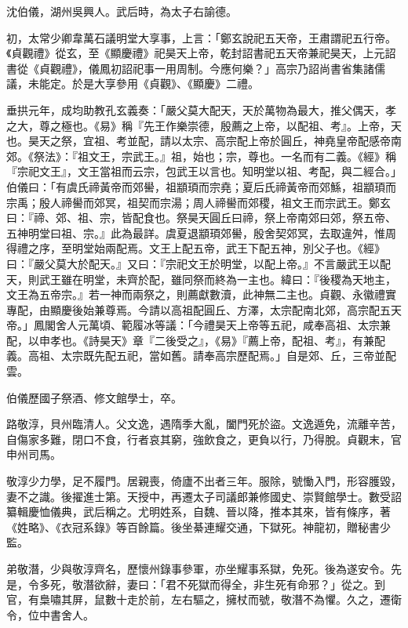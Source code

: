 \begin{pinyinscope}
 沈伯儀，湖州吳興人。武后時，為太子右諭德。



 初，太常少卿韋萬石議明堂大享事，上言：「鄭玄說祀五天帝，王肅謂祀五行帝。《貞觀禮》從玄，至《顯慶禮》祀昊天上帝，乾封詔書祀五天帝兼祀昊天，上元詔書從《貞觀禮》，儀鳳初詔祀事一用周制。今應何樂？」高宗乃詔尚書省集諸儒議，未能定。於是大享參用《貞觀》、《顯慶》二禮。



 垂拱元年，成均助教孔玄義奏：「嚴父莫大配天，天於萬物為最大，推父偶天，孝之大，尊之極也。《易》稱『先王作樂崇德，殷薦之上帝，以配祖、考』。上帝，天也。昊天之祭，宜祖、考並配，請以太宗、高宗配上帝於圓丘，神堯皇帝配感帝南郊。《祭法》：『祖文王，宗武王。』祖，始也；宗，尊也。一名而有二義。《經》稱『宗祀文王』，文王當祖而云宗，包武王以言也。知明堂以祖、考配，與二經合。」伯儀曰：「有虞氏禘黃帝而郊嚳，祖顓頊而宗堯；夏后氏禘黃帝而郊鯀，祖顓頊而宗禹；殷人禘嚳而郊冥，祖契而宗湯；周人禘嚳而郊稷，祖文王而宗武王。鄭玄曰：『禘、郊、祖、宗，皆配食也。祭昊天圓丘曰禘，祭上帝南郊曰郊，祭五帝、五神明堂曰祖、宗。』此為最詳。虞夏退顓頊郊嚳，殷舍契郊冥，去取違舛，惟周得禮之序，至明堂始兩配焉。文王上配五帝，武王下配五神，別父子也。《經》曰：『嚴父莫大於配天。』又曰：『宗祀文王於明堂，以配上帝。』不言嚴武王以配天，則武王雖在明堂，未齊於配，雖同祭而終為一主也。緯曰：『後稷為天地主，文王為五帝宗。』若一神而兩祭之，則薦獻數瀆，此神無二主也。貞觀、永徽禮實專配，由顯慶後始兼尊焉。今請以高祖配圓丘、方澤，太宗配南北郊，高宗配五天帝。」鳳閣舍人元萬頃、範履冰等議：「今禮昊天上帝等五祀，咸奉高祖、太宗兼配，以申孝也。《詩昊天》章『二後受之』，《易》『薦上帝，配祖、考』，有兼配義。高祖、太宗既先配五祀，當如舊。請奉高宗歷配焉。」自是郊、丘，三帝並配雲。



 伯儀歷國子祭酒、修文館學士，卒。



 路敬淳，貝州臨清人。父文逸，遇隋季大亂，闔門死於盜。文逸遁免，流離辛苦，自傷家多難，閉口不食，行者哀其窮，強飲食之，更負以行，乃得脫。貞觀末，官申州司馬。



 敬淳少力學，足不履門。居親喪，倚廬不出者三年。服除，號慟入門，形容臒毀，妻不之識。後擢進士第。天授中，再遷太子司議郎兼修國史、崇賢館學士。數受詔纂輯慶恤儀典，武后稱之。尤明姓系，自魏、晉以降，推本其來，皆有條序，著《姓略》、《衣冠系錄》等百餘篇。後坐綦連耀交通，下獄死。神龍初，贈秘書少監。



 弟敬潛，少與敬淳齊名，歷懷州錄事參軍，亦坐耀事系獄，免死。後為遂安令。先是，令多死，敬潛欲辭，妻曰：「君不死獄而得全，非生死有命邪？」從之。到官，有梟嘯其屏，鼠數十走於前，左右驅之，擁杖而號，敬潛不為懼。久之，遷衛令，位中書舍人。




\end{pinyinscope}
